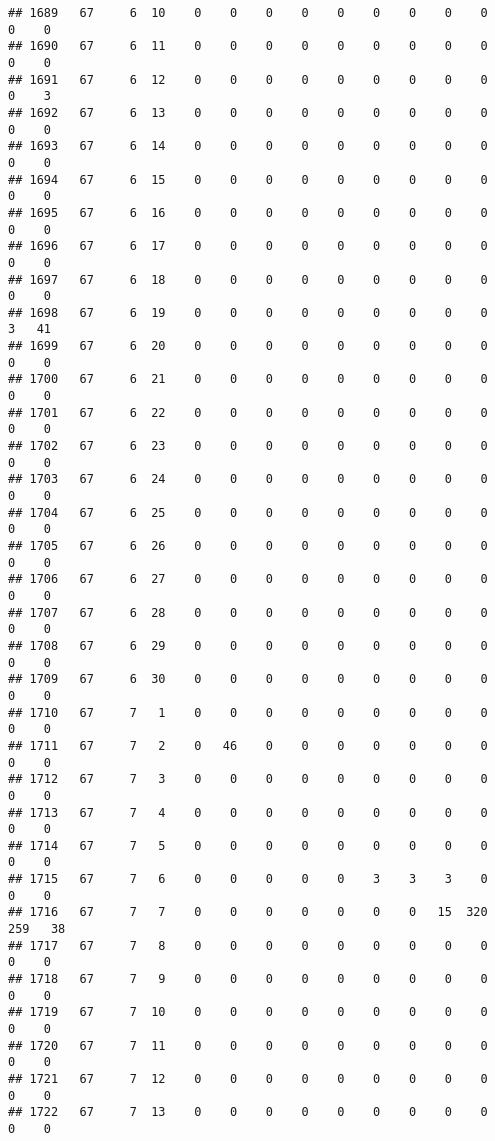 \documentclass[]{article}
\begin{document}
\begin{verbatim}
## 1689   67     6  10    0    0    0    0    0    0    0    0    0    0    0
## 1690   67     6  11    0    0    0    0    0    0    0    0    0    0    0
## 1691   67     6  12    0    0    0    0    0    0    0    0    0    0    3
## 1692   67     6  13    0    0    0    0    0    0    0    0    0    0    0
## 1693   67     6  14    0    0    0    0    0    0    0    0    0    0    0
## 1694   67     6  15    0    0    0    0    0    0    0    0    0    0    0
## 1695   67     6  16    0    0    0    0    0    0    0    0    0    0    0
## 1696   67     6  17    0    0    0    0    0    0    0    0    0    0    0
## 1697   67     6  18    0    0    0    0    0    0    0    0    0    0    0
## 1698   67     6  19    0    0    0    0    0    0    0    0    0    3   41
## 1699   67     6  20    0    0    0    0    0    0    0    0    0    0    0
## 1700   67     6  21    0    0    0    0    0    0    0    0    0    0    0
## 1701   67     6  22    0    0    0    0    0    0    0    0    0    0    0
## 1702   67     6  23    0    0    0    0    0    0    0    0    0    0    0
## 1703   67     6  24    0    0    0    0    0    0    0    0    0    0    0
## 1704   67     6  25    0    0    0    0    0    0    0    0    0    0    0
## 1705   67     6  26    0    0    0    0    0    0    0    0    0    0    0
## 1706   67     6  27    0    0    0    0    0    0    0    0    0    0    0
## 1707   67     6  28    0    0    0    0    0    0    0    0    0    0    0
## 1708   67     6  29    0    0    0    0    0    0    0    0    0    0    0
## 1709   67     6  30    0    0    0    0    0    0    0    0    0    0    0
## 1710   67     7   1    0    0    0    0    0    0    0    0    0    0    0
## 1711   67     7   2    0   46    0    0    0    0    0    0    0    0    0
## 1712   67     7   3    0    0    0    0    0    0    0    0    0    0    0
## 1713   67     7   4    0    0    0    0    0    0    0    0    0    0    0
## 1714   67     7   5    0    0    0    0    0    0    0    0    0    0    0
## 1715   67     7   6    0    0    0    0    0    3    3    3    0    0    0
## 1716   67     7   7    0    0    0    0    0    0    0   15  320  259   38
## 1717   67     7   8    0    0    0    0    0    0    0    0    0    0    0
## 1718   67     7   9    0    0    0    0    0    0    0    0    0    0    0
## 1719   67     7  10    0    0    0    0    0    0    0    0    0    0    0
## 1720   67     7  11    0    0    0    0    0    0    0    0    0    0    0
## 1721   67     7  12    0    0    0    0    0    0    0    0    0    0    0
## 1722   67     7  13    0    0    0    0    0    0    0    0    0    0    0

\end{verbatim}
\end{document}
